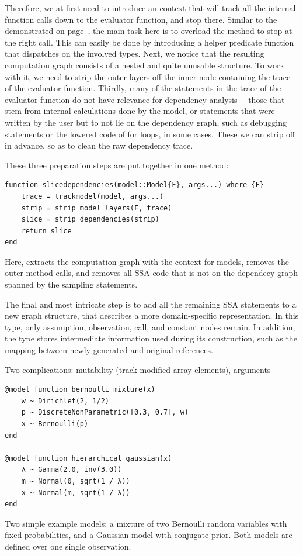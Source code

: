 Therefore, we at first need to introduce an \irtrackerjl{} context that will track all the internal
function calls down to the evaluator function, and stop there.  Similar to the
 demonstrated on page~\pageref{lst:depthlimitcontext}, the main task here
is to overload the  method to stop at the right call.  This can easily be done by
introducing a helper predicate function  that dispatches on the involved types.
Next, we notice that the resulting computation graph consists of a nested and quite unusable
structure.  To work with it, we need to strip the outer layers off the inner node containing the
trace of the evaluator function.  Thirdly, many of the statements in the trace of the evaluator
function do not have relevance for dependency analysis~-- those that stem from internal calculations
done by the model, or statements that were written by the user but to not lie on the dependency
graph, such as debugging statements or the lowered code of for loops, in some cases.  These we can
strip off in advance, so as to clean the raw dependency trace.

These three preparation steps are put together in one method:
\begin{lstlisting}
function slicedependencies(model::Model{F}, args...) where {F}
    trace = trackmodel(model, args...)
    strip = strip_model_layers(F, trace)
    slice = strip_dependencies(strip)
    return slice
end
\end{lstlisting}
Here,  extracts the computation graph with the context for \dppljl{} models,
 removes the outer method calls, and  removes
all SSA code that is not on the dependecy graph spanned by the sampling statements.

The final and most intricate step is to add all the remaining SSA statements to a new graph
structure, that describes a more domain-specific representation.  In this  type, only
assumption, observation, call, and constant nodes remain.  In addition, the type stores intermediate
information used during its construction, such as the mapping between newly generated and original
references.

Two complications: mutability (track modified array elements), arguments

\begin{lstfloat}[t]
\begin{lstlisting}[style=lstfloat]
@model function bernoulli_mixture(x)
    w ~ Dirichlet(2, 1/2)
    p ~ DiscreteNonParametric([0.3, 0.7], w)
    x ~ Bernoulli(p)
end

@model function hierarchical_gaussian(x)
    λ ~ Gamma(2.0, inv(3.0))
    m ~ Normal(0, sqrt(1 / λ))
    x ~ Normal(m, sqrt(1 / λ))
end
\end{lstlisting}
  \caption{Two simple example models: a mixture of two Bernoulli random variables with fixed
    probabilities, and a Gaussian model with conjugate prior.  Both models are defined over one
    single observation.}
  \label{lst:dependency-examples}
\end{lstfloat}

